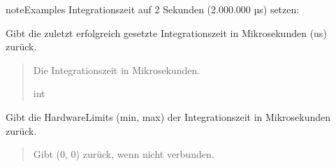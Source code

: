 \documentclass[letterpaper,10pt,english]{sphinxmanual}
\begin{document}
\begin{fulllineitems}
\begin{fulllineitems}
\begin{sphinxadmonition}{note}{Examples}
\sphinxAtStartPar
Integrationszeit auf 2 Sekunden (2.000.000 µs) setzen:

\begin{sphinxVerbatim}[commandchars=\\\{\}]
\end{sphinxVerbatim}
\end{sphinxadmonition}

\end{fulllineitems}


\begin{fulllineitems}
\label{\detokenize{modulab/spectrometer_manager:modules.spectrometer.SpectrometerManager.SpectrometerManager.get_integrationtime}}
\pysigstartsignatures
\pysiglinewithargsret
{}
{}
{}
\pysigstopsignatures
\sphinxAtStartPar
Gibt die zuletzt erfolgreich gesetzte Integrationszeit in Mikrosekunden (us) zurück.
\begin{quote}\begin{description}
\sphinxAtStartPar
Die Integrationszeit in Mikrosekunden.

\sphinxAtStartPar
int

\end{description}\end{quote}

\end{fulllineitems}


\begin{fulllineitems}
\label{\detokenize{modulab/spectrometer_manager:modules.spectrometer.SpectrometerManager.SpectrometerManager.get_integrationtime_limits_us}}
\pysigstartsignatures
\pysiglinewithargsret
{}
{}
{}
\pysigstopsignatures
\sphinxAtStartPar
Gibt die Hardware\sphinxhyphen{}Limits (min, max) der Integrationszeit in Mikrosekunden zurück.
\begin{quote}\begin{description}
\sphinxAtStartPar
\begin{description}
\sphinxAtStartPar
Gibt (0, 0) zurück, wenn nicht verbunden.


\end{description}
\end{description}
\end{quote}
\end{fulllineitems}
\end{fulllineitems}
\end{document}
